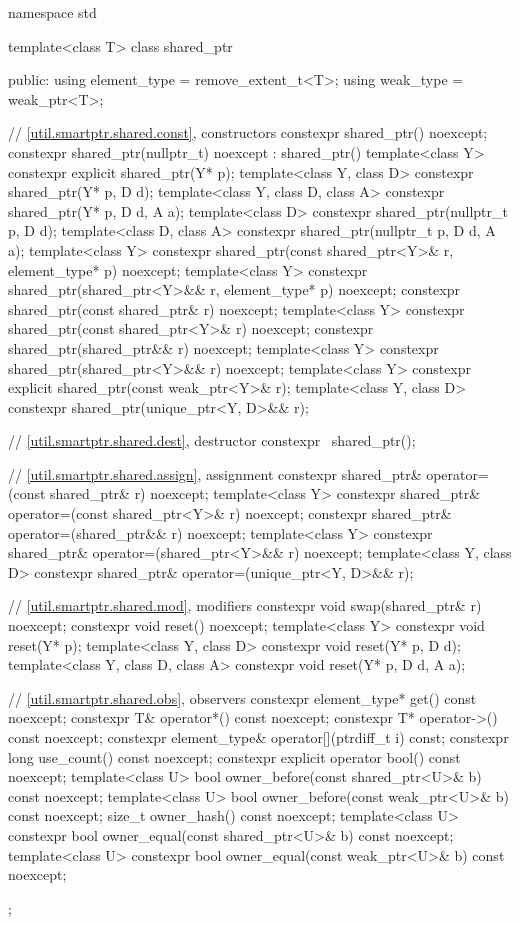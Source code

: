\begin{codeblock}
namespace std {
  template<class T> class shared_ptr {
  public:
    using element_type = remove_extent_t<T>;
    using weak_type    = weak_ptr<T>;

    // \ref{util.smartptr.shared.const}, constructors
    constexpr shared_ptr() noexcept;
    constexpr shared_ptr(nullptr_t) noexcept : shared_ptr() { }
    template<class Y>
      constexpr explicit shared_ptr(Y* p);
    template<class Y, class D>
      constexpr shared_ptr(Y* p, D d);
    template<class Y, class D, class A>
      constexpr shared_ptr(Y* p, D d, A a);
    template<class D>
      constexpr shared_ptr(nullptr_t p, D d);
    template<class D, class A>
      constexpr shared_ptr(nullptr_t p, D d, A a);
    template<class Y>
      constexpr shared_ptr(const shared_ptr<Y>& r, element_type* p) noexcept;
    template<class Y>
      constexpr shared_ptr(shared_ptr<Y>&& r, element_type* p) noexcept;
    constexpr shared_ptr(const shared_ptr& r) noexcept;
    template<class Y>
      constexpr shared_ptr(const shared_ptr<Y>& r) noexcept;
    constexpr shared_ptr(shared_ptr&& r) noexcept;
    template<class Y>
      constexpr shared_ptr(shared_ptr<Y>&& r) noexcept;
    template<class Y>
      constexpr explicit shared_ptr(const weak_ptr<Y>& r);
    template<class Y, class D>
      constexpr shared_ptr(unique_ptr<Y, D>&& r);

    // \ref{util.smartptr.shared.dest}, destructor
    constexpr ~shared_ptr();

    // \ref{util.smartptr.shared.assign}, assignment
    constexpr shared_ptr& operator=(const shared_ptr& r) noexcept;
    template<class Y>
      constexpr shared_ptr& operator=(const shared_ptr<Y>& r) noexcept;
    constexpr shared_ptr& operator=(shared_ptr&& r) noexcept;
    template<class Y>
      constexpr shared_ptr& operator=(shared_ptr<Y>&& r) noexcept;
    template<class Y, class D>
      constexpr shared_ptr& operator=(unique_ptr<Y, D>&& r);

    // \ref{util.smartptr.shared.mod}, modifiers
    constexpr void swap(shared_ptr& r) noexcept;
    constexpr void reset() noexcept;
    template<class Y>
      constexpr void reset(Y* p);
    template<class Y, class D>
      constexpr void reset(Y* p, D d);
    template<class Y, class D, class A>
      constexpr void reset(Y* p, D d, A a);

    // \ref{util.smartptr.shared.obs}, observers
    constexpr element_type* get() const noexcept;
    constexpr T& operator*() const noexcept;
    constexpr T* operator->() const noexcept;
    constexpr element_type& operator[](ptrdiff_t i) const;
    constexpr long use_count() const noexcept;
    constexpr explicit operator bool() const noexcept;
    template<class U>
      bool owner_before(const shared_ptr<U>& b) const noexcept;
    template<class U>
      bool owner_before(const weak_ptr<U>& b) const noexcept;
    size_t owner_hash() const noexcept;
    template<class U>
      constexpr bool owner_equal(const shared_ptr<U>& b) const noexcept;
    template<class U>
      constexpr bool owner_equal(const weak_ptr<U>& b) const noexcept;
  };

}
\end{codeblock}
